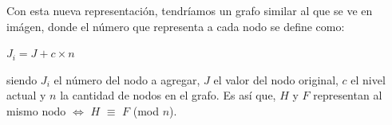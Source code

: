 \begin{algorithm}[H]
	\NoCaptionOfAlgo
	\caption{}
	
\end{algorithm}

Con esta nueva representación, tendríamos un grafo similar al que se ve en imágen, donde el número que representa a cada nodo se define como:

\begin{center}
	$J_i =	J + c \times n$
\end{center}

siendo $J_i$ el número del nodo a agregar, $J$ el valor del nodo original, $c$ el nivel actual y $n$ la cantidad de nodos en el grafo. Es así que, $H$ y $F$ representan al mismo nodo $\Leftrightarrow$ $H$ $\equiv$ $F$ (mod $n$).

\smallskip

